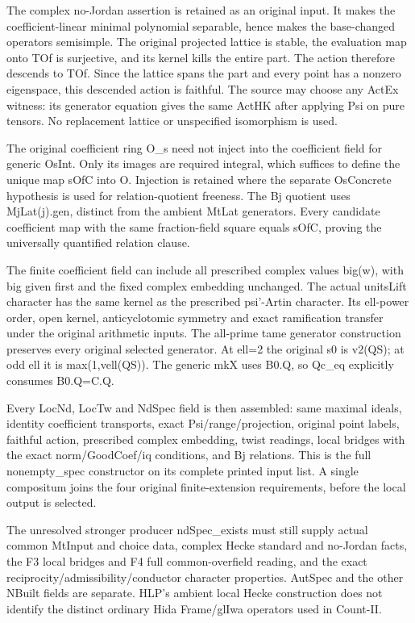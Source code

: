 The complex no-Jordan assertion is retained as an original input. It makes the coefficient-linear minimal polynomial separable, hence makes the base-changed operators semisimple. The original projected lattice is stable, the evaluation map onto TOf is surjective, and its kernel kills the entire part. The action therefore descends to TOf. Since the lattice spans the part and every point has a nonzero eigenspace, this descended action is faithful. The source may choose any ActEx witness: its generator equation gives the same ActHK after applying Psi on pure tensors. No replacement lattice or unspecified isomorphism is used.

The original coefficient ring O\_\allowbreak{}s need not inject into the coefficient field for generic OsInt. Only its images are required integral, which suffices to define the unique map sOfC into O. Injection is retained where the separate OsConcrete hypothesis is used for relation-quotient freeness. The Bj quotient uses MjLat(j).gen, distinct from the ambient MtLat generators. Every candidate coefficient map with the same fraction-field square equals sOfC, proving the universally quantified relation clause.

The finite coefficient field can include all prescribed complex values big(w), with big given first and the fixed complex embedding unchanged. The actual unitsLift character has the same kernel as the prescribed psi'-Artin character. Its ell-power order, open kernel, anticyclotomic symmetry and exact ramification transfer under the original arithmetic inputs. The all-prime tame generator construction preserves every original selected generator. At ell=2 the original s0 is v2(QS); at odd ell it is max(1,vell(QS)). The generic mkX uses B0.Q, so Qc\_\allowbreak{}eq explicitly consumes B0.Q=C.Q.

Every LocNd, LocTw and NdSpec field is then assembled: same maximal ideals, identity coefficient transports, exact Psi/\allowbreak{}range/\allowbreak{}projection, original point labels, faithful action, prescribed complex embedding, twist readings, local bridges with the exact norm/\allowbreak{}GoodCoef/\allowbreak{}iq conditions, and Bj relations. This is the full nonempty\_\allowbreak{}spec constructor on its complete printed input list. A single compositum joins the four original finite-extension requirements, before the local output is selected.

The unresolved stronger producer ndSpec\_\allowbreak{}exists must still supply actual common MtInput and choice data, complex Hecke standard and no-Jordan facts, the F3 local bridges and F4 full common-overfield reading, and the exact reciprocity/\allowbreak{}admissibility/\allowbreak{}conductor character properties. AutSpec and the other NBuilt fields are separate. HLP's ambient local Hecke construction does not identify the distinct ordinary Hida Frame/\allowbreak{}glIwa operators used in Count-II.

